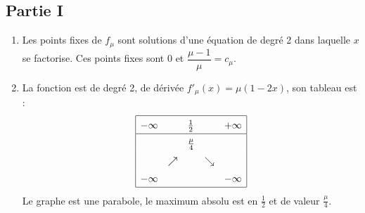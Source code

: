 \subsection*{Partie I}
\begin{enumerate}
 \item Les points fixes de $f_\mu$ sont solutions d'une équation de degré 2 dans laquelle $x$ se factorise. Ces points fixes sont $0$ et $\dfrac{\mu -1}{\mu} = c_\mu$.

 \item La fonction est de degré 2, de dérivée $f'_\mu(x)=\mu(1-2x)$, son tableau est :
\begin{displaymath}
\renewcommand{\arraystretch}{1.5}
\begin{array}{|lllll|}
\hline
-\infty &          & \frac{1}{2}   &          & +\infty \\ \hline
        &          & \frac{\mu}{4} &          &   \\ 
        & \nearrow &               & \searrow &  \\ 
-\infty &          &               &          & -\infty \\ \hline
\end{array}
\end{displaymath}
Le graphe est une parabole, le maximum absolu est en $\frac{1}{2}$ et de valeur $\frac{\mu}{4}$.


\end{enumerate}
